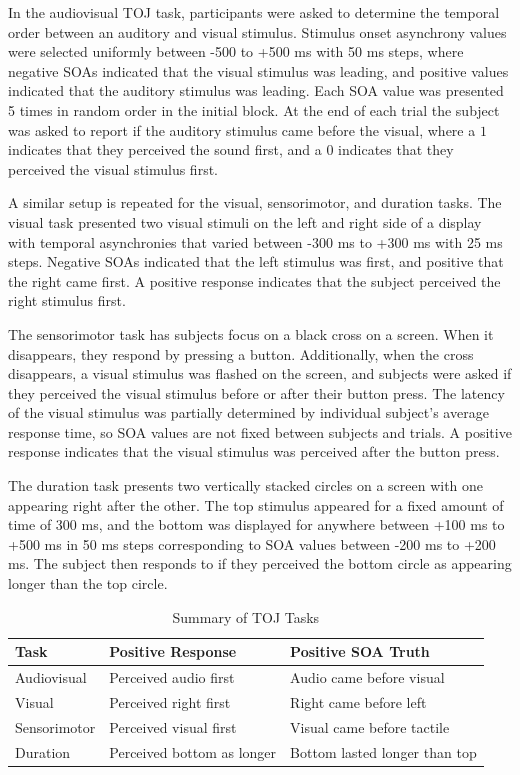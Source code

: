 \documentclass[11pt, oneside, openany]{scrbook}
\begin{document}
In the audiovisual TOJ task, participants were asked to determine the temporal order between an auditory and visual stimulus. Stimulus onset asynchrony values were selected uniformly between -500 to +500 ms with 50 ms steps, where negative SOAs indicated that the visual stimulus was leading, and positive values indicated that the auditory stimulus was leading. Each SOA value was presented 5 times in random order in the initial block. At the end of each trial the subject was asked to report if the auditory stimulus came before the visual, where a \(1\) indicates that they perceived the sound first, and a \(0\) indicates that they perceived the visual stimulus first.

A similar setup is repeated for the visual, sensorimotor, and duration tasks. The visual task presented two visual stimuli on the left and right side of a display with temporal asynchronies that varied between -300 ms to +300 ms with 25 ms steps. Negative SOAs indicated that the left stimulus was first, and positive that the right came first. A positive response indicates that the subject perceived the right stimulus first.

The sensorimotor task has subjects focus on a black cross on a screen. When it disappears, they respond by pressing a button. Additionally, when the cross disappears, a visual stimulus was flashed on the screen, and subjects were asked if they perceived the visual stimulus before or after their button press. The latency of the visual stimulus was partially determined by individual subject's average response time, so SOA values are not fixed between subjects and trials. A positive response indicates that the visual stimulus was perceived after the button press.

The duration task presents two vertically stacked circles on a screen with one appearing right after the other. The top stimulus appeared for a fixed amount of time of 300 ms, and the bottom was displayed for anywhere between +100 ms to +500 ms in 50 ms steps corresponding to SOA values between -200 ms to +200 ms. The subject then responds to if they perceived the bottom circle as appearing longer than the top circle.

\begin{table}[!h]

\caption{\label{tab:ch020-toj-summary}Summary of TOJ Tasks}
\centering
\begin{tabular}[t]{lll}
\toprule
Task & Positive Response & Positive SOA Truth\\
\midrule
Audiovisual & Perceived audio first & Audio came before visual\\
Visual & Perceived right first & Right came before left\\
Sensorimotor & Perceived visual first & Visual came before tactile\\
Duration & Perceived bottom as longer & Bottom lasted longer than top\\
\bottomrule
\end{tabular}
\end{table}
\end{document}

